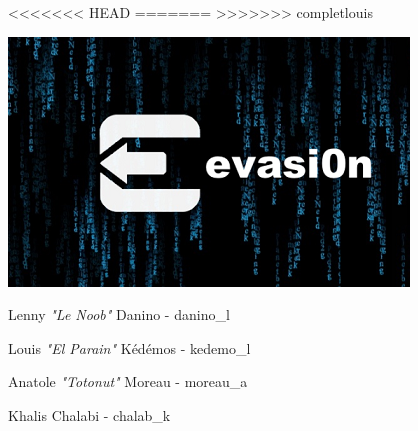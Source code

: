 \documentclass{report}
\begin{document}
\thispagestyle{empty}
\begin{center}
<<<<<<< HEAD
=======
>>>>>>> completlouis
\end{center}

\vspace*{0.7cm}

\begin{center}
\end{center}

\vspace*{0.5cm}

\begin{center}
\includegraphics[scale=01.0]{evasion}
\end{center}

\vspace*{0.5cm}

\fontsize{14}{14}
\begin{center}
{Lenny \textcolor{pseudorouge}{\textit{"Le Noob"}} Danino - danino\_l}
\end{center}
\begin{center}
Louis \textcolor{pseudoblue}{\textit{"El Parain"}} Kédémos - kedemo\_l
\end{center}
\begin{center}
 Anatole \textcolor{pseudoblue}{\textit{"Totonut"}} Moreau - moreau\_a
\end{center}
\begin{center}
Khalis Chalabi - chalab\_k
\end{center}
\end{document}

